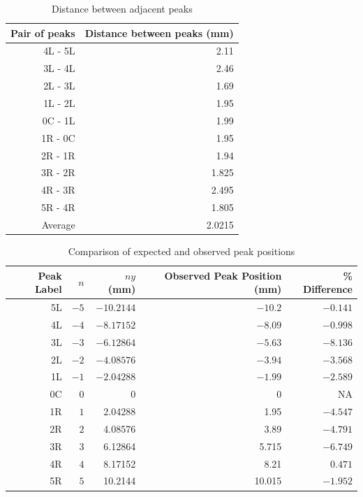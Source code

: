 \begin{table}[ht]
	\centering
	\begin{tabular}{|r|r|} \hline
		Pair of peaks & Distance between peaks (mm) \\
		\hline
		4L - 5L & 2.11 \\
		3L - 4L & 2.46 \\
		2L - 3L & 1.69 \\
		1L - 2L & 1.95 \\
		0C - 1L & 1.99 \\
		1R - 0C & 1.95 \\
		2R - 1R & 1.94 \\
		3R - 2R & 1.825 \\
		4R - 3R & 2.495 \\
		5R - 4R & 1.805 \\
		\hline
		Average & 2.0215 \\
		\hline
	\end{tabular}
	\caption{Distance between adjacent peaks}
	\label{table.disA}
\end{table}
\begin{table}[ht]
	\centering
	\begin{tabular}{|r|r|r|r|r|} \hline
		Peak Label & $n$ & $n y$ (mm) & Observed Peak Position (mm) & \% Difference \\
		\hline
		5L & $-5$ & $-10.2144$ & $-10.2$ & $-0.141$ \\
		4L & $-4$ & $-8.17152$ & $-8.09$ & $-0.998$ \\
		3L & $-3$ & $-6.12864$ & $-5.63$ & $-8.136$ \\
		2L & $-2$ & $-4.08576$ & $-3.94$ & $-3.568$ \\
		1L & $-1$ & $-2.04288$ & $-1.99$ & $-2.589$ \\
		0C & $0$ & 0 & 0 & NA \\
		1R & $1$ & 2.04288 & 1.95 & $-4.547$ \\
		2R & $2$ & 4.08576 & 3.89 & $-4.791$ \\
		3R & $3$ & 6.12864 & 5.715 & $-6.749$ \\
		4R & $4$ & 8.17152 & 8.21 & $0.471$ \\
		5R & $5$ & 10.2144 & 10.015 & $-1.952$ \\
		\hline
	\end{tabular}
	\caption{Comparison of expected and observed peak positions}
	\label{compa}
\end{table}
